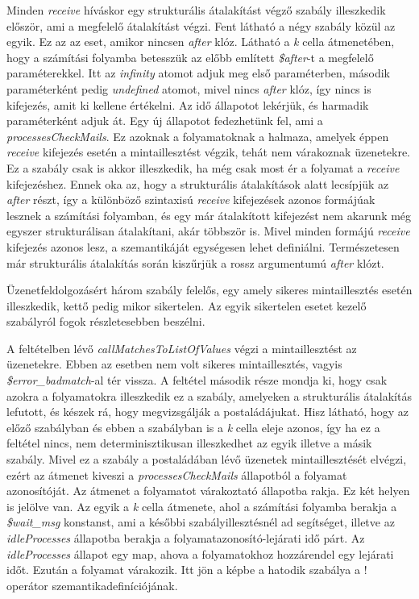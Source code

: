 Minden \textit{receive} híváskor egy strukturális átalakítást végző szabály illeszkedik először, ami a megfelelő átalakítást végzi. Fent látható a négy szabály közül az egyik. Ez az az eset, amikor nincsen \textit{after} klóz. Látható a \textit{k} cella átmenetében, hogy a számítási folyamba betesszük az előbb említett \textit{\$after}-t a megfelelő paraméterekkel. Itt az \textit{infinity} atomot adjuk meg első paraméterben, második paraméterként pedig \textit{undefined} atomot, mivel nincs \textit{after} klóz, így nincs is kifejezés, amit ki kellene értékelni. Az idő állapotot lekérjük, és harmadik paraméterként adjuk át. Egy új állapotot fedezhetünk fel, ami a \textit{processesCheckMails}. Ez azoknak a folyamatoknak a halmaza, amelyek éppen \textit{receive} kifejezés esetén a mintaillesztést végzik, tehát nem várakoznak üzenetekre. Ez a szabály csak is akkor illeszkedik, ha még csak most ér a folyamat a \textit{receive} kifejezéshez. Ennek oka az, hogy a strukturális átalakítások alatt lecsípjük az \textit{after} részt, így a különböző szintaxisú \textit{receive} kifejezések azonos formájúak lesznek a számítási folyamban, és egy már átalakított kifejezést nem akarunk még egyszer strukturálisan átalakítani, akár többször is. Mivel minden formájú \textit{receive} kifejezés azonos lesz, a szemantikáját egységesen lehet definiálni. Természetesen már strukturális átalakítás során kiszűrjük a rossz argumentumú \textit{after} klózt.

Üzenetfeldolgozásért három szabály felelős, egy amely sikeres mintaillesztés esetén illeszkedik, kettő pedig mikor sikertelen. Az egyik sikertelen esetet kezelő szabályról fogok részletesebben beszélni.



A feltételben lévő \textit{callMatchesToListOfValues} végzi a mintaillesztést az üzenetekre. Ebben az esetben nem volt sikeres mintaillesztés, vagyis \textit{\$error\_badmatch}-al tér vissza. A feltétel második része mondja ki, hogy csak azokra a folyamatokra illeszkedik ez a szabály, amelyeken a strukturális átalakítás lefutott, és készek rá, hogy megvizsgálják a postaládájukat. Hisz látható, hogy az előző szabályban és ebben a szabályban is a \textit{k} cella eleje azonos, így ha ez a feltétel nincs, nem determinisztikusan illeszkedhet az egyik illetve a másik szabály. Mivel ez a szabály a postaládában lévő üzenetek mintaillesztését elvégzi, ezért az átmenet kiveszi a \textit{processesCheckMails} állapotból a folyamat azonosítóját. Az átmenet a folyamatot várakoztató állapotba rakja. Ez két helyen is jelölve van. Az egyik a \textit{k} cella átmenete, ahol a számítási folyamba berakja a \textit{\$wait\_msg} konstanst, ami a későbbi szabályillesztésnél ad segítséget, illetve az \textit{idleProcesses} állapotba berakja a folyamatazonosító-lejárati idő párt. Az \textit{idleProcesses} állapot egy map, ahova a folyamatokhoz hozzárendel egy lejárati időt. Ezután a folyamat várakozik. Itt jön a képbe a hatodik szabálya a ! operátor szemantikadefiníciójának.

